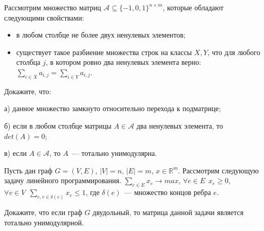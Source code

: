 \setcounter{curtask}{31}


\begin{task}
	Рассмотрим множество матриц $\mathcal{A} \subseteq \{-1, 0, 1\}^{n \times m}$,
	которые обладают следующими свойствами:
    \begin{itemize}
		\item в любом столбце не более двух ненулевых элементов;
    	\item существует такое разбиение множества строк на классы $X, Y$, что
		    для любого столбца $j$, в котором ровно два ненулевых элемента верно:
            $\sum\limits_{i \in X}{a_{i,j}} = \sum\limits_{i \in Y}{a_{i,j}}$.
    \end{itemize}

    Докажите, что:
    
    а) данное множество замкнуто относительно перехода к подматрице;
    
    б) если в любом столбце матрицы $A \in \mathcal{A}$ два ненулевых элемента, то
	$det(A) = 0$;
   
    в) если $A \in \mathcal{A}$, то $A$~--- тотально унимодулярна.
\end{task}


\begin{task}
    Пусть дан граф $G = (V, E)$, $|V| = n$, $|E| = m$, $x \in
    \mathbb{R}^m$. Рассмотрим следующую задачу линейного программирования.
    $\sum_{e \in E} x_e \rightarrow max$, $\forall e \in E ~~ x_e \ge 0$,
    $\forall v \in V ~~ \sum_{e, v \in \delta(e)} x_e \le 1$, где $\delta(e)$~---
    множество концов ребра $e$.

    Докажите, что если граф $G$ двудольный, то матрица данной задачи является
    тотально унимодулярной.
\end{task}




